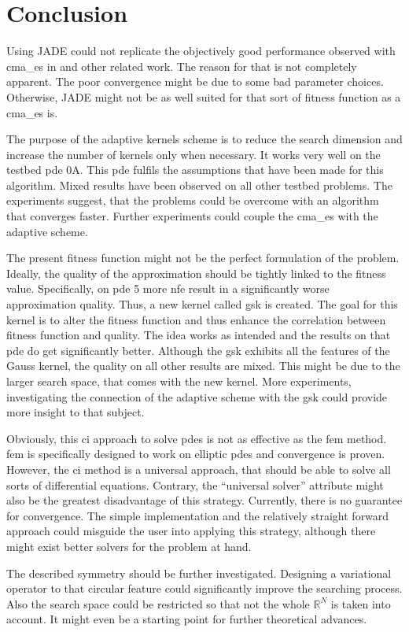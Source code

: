 \documentclass[./\jobname.tex]{subfiles}
\begin{document}
\section{Conclusion}

Using JADE could not replicate the objectively good performance observed with \gls{cma_es} in \cite{chaquet_using_2019} and other related work. The reason for that is not completely apparent. The poor convergence might be due to some bad parameter choices. Otherwise, JADE might not be as well suited for that sort of fitness function as a \gls{cma_es} is. 

The purpose of the adaptive kernels scheme is to reduce the search dimension and increase the number of kernels only when necessary. It works very well on the testbed \gls{pde} 0A. This \gls{pde} fulfils the assumptions that have been made for this algorithm. Mixed results have been observed on all other testbed problems. The experiments suggest, that the problems could be overcome with an algorithm that converges faster. Further experiments could couple the \gls{cma_es} with the adaptive scheme. 

The present fitness function might not be the perfect formulation of the problem. Ideally, the quality of the approximation should be tightly linked to the fitness value. Specifically, on \gls{pde} 5 more \gls{nfe} result in a significantly worse approximation quality. Thus, a new kernel called \gls{gsk} is created. The goal for this kernel is to alter the fitness function and thus enhance the correlation between fitness function and quality. The idea works as intended and the results on that \gls{pde} do get significantly better. Although the \gls{gsk} exhibits all the features of the Gauss kernel, the quality on all other results are mixed. This might be due to the larger search space, that comes with the new kernel. More experiments, investigating the connection of the adaptive scheme with the \gls{gsk} could provide more insight to that subject.

Obviously, this \gls{ci} approach to solve \gls{pde}s is not as effective as the \gls{fem} method. \gls{fem} is specifically designed to work on elliptic \gls{pde}s and convergence is proven. However, the \gls{ci} method is a universal approach, that should be able to solve all sorts of differential equations. Contrary, the ``universal solver'' attribute might also be the greatest disadvantage of this strategy. Currently, there is no guarantee for convergence. The simple implementation and the relatively straight forward approach could misguide the user into applying this strategy, although there might exist better solvers for the problem at hand. 

The described symmetry should be further investigated. Designing a variational operator to that circular feature could significantly improve the searching process. Also the search space could be restricted so that not the whole $\mathbb{R}^N$ is taken into account. It might even be a starting point for further theoretical advances.
\end{document}
